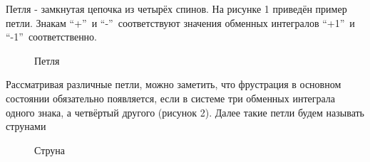\documentclass[utf8, babel, sor, jor, amsmath, amssymb, reprint]{elsarticle} %
\begin{document}
Петля - замкнутая цепочка из четырёх спинов. На рисунке 1 приведён пример петли. Знакам \textquotedblleft +\textquotedblright ~и   \textquotedblleft -\textquotedblright ~соответствуют значения обменных интегралов  \textquotedblleft +1\textquotedblright ~и \textquotedblleft -1\textquotedblright ~соответственно.

\begin{figure}[h]
	\centering
	\caption{Петля}
	\label{fig:petlya}
\end{figure}

Рассматривая различные петли, можно заметить, что фрустрация в основном состоянии обязательно появляется, если в системе три обменных интеграла одного знака, а четвёртый другого (рисунок 2). Далее такие петли будем называть струнами

\begin{figure}[h]
	\centering
	\caption{Струна}
	\label{fig:struna}
\end{figure}
\end{document}
